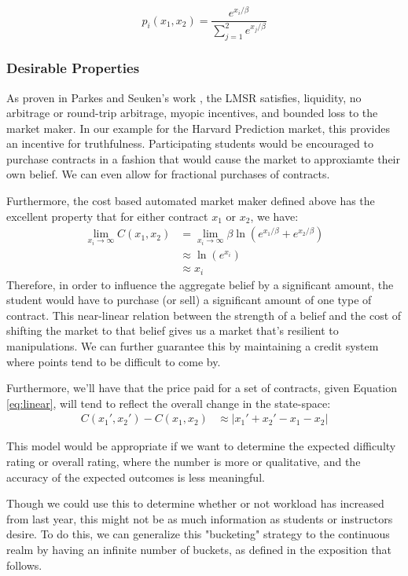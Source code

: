 \begin{equation}
p_i(x_1,x_2) = \dfrac{e^{x_i/\beta}}{\sum_{j=1}^2 e^{x_{j}/\beta}}\label{eq:pricefun}
\end{equation}

\subsubsection{Desirable Properties}
As proven in Parkes and Seuken's work \cite{textbook}, the LMSR satisfies, liquidity, no arbitrage or round-trip arbitrage, myopic incentives, and bounded loss to the market maker. In our example for the Harvard Prediction market, this provides an incentive for truthfulness. Participating students would be encouraged to purchase contracts in a fashion that would cause the market to approxiamte their own belief. We can even allow for fractional purchases of contracts.

Furthermore, the cost based automated market maker defined above has the excellent property that for either contract $x_1$ or $x_2$, we have:
\begin{align}
\lim_{x_i \to \infty} C(x_1,x_2) &= \lim_{x_i \to \infty} \beta \ln (e^{x_1/\beta} + e^{x_2/\beta}) \\
&\approx \ln (e^{x_i}) \\
&\approx x_i \label{eq:linear}
\end{align}
Therefore, in order to influence the aggregate belief by a significant amount, the student would have to purchase (or sell) a significant amount of one type of contract. This near-linear relation between the strength of a belief and the cost of shifting the market to that belief gives us a market that's resilient to manipulations. We can further guarantee this by maintaining a credit system where points tend to be difficult to come by.

Furthermore, we'll have that the price paid for a set of contracts, given Equation \ref{eq:linear}, will tend to reflect the overall change in the state-space:
\begin{align}
C(x_1',x_2') - C(x_1,x_2) &\approx |x_1' + x_2' - x_1 - x_2| 
\end{align}

This model would be appropriate if we want to determine the expected difficulty rating or overall rating, where the number is more or qualitative, and the accuracy of the expected outcomes is less meaningful.

Though we could use this to determine whether or not workload has increased from last year, this might not be as much information as students or instructors desire. To do this, we can generalize this "bucketing" strategy to the continuous realm by having an infinite number of buckets, as defined in the exposition that follows.

